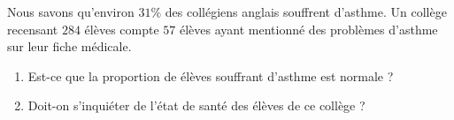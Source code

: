 
\begin{exercice}\label{exosmath-0348}

    Nous savons qu'environ \( 31\%\) des collégiens anglais souffrent d'asthme. Un collège recensant \( 284\) élèves compte \( 57\) élèves ayant mentionné des problèmes d'asthme sur leur fiche médicale.
    \begin{enumerate}
        \item
            Est-ce que la proportion de élèves souffrant d'asthme est normale ?
        \item
            Doit-on s'inquiéter de l'état de santé des élèves de ce collège ?
    \end{enumerate}

\end{exercice}
